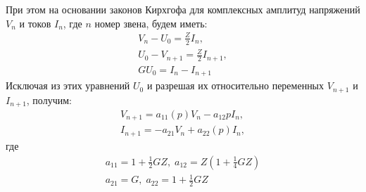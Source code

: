 При этом на основании законов Кирхгофа для комплексных амплитуд напряжений $V_n$ и токов $I_n$, где $n$ номер звена, будем иметь:
\begin{equation}
	\label{eq:1.1}
	\begin{gathered}
	V_n-U_0=\frac{Z}{2}I_n, \\
	U_0-V_{n+1}=\frac{Z}{2}I_{n+1}, \\
	GU_0=I_n-I_{n+1}
	\end{gathered}
\end{equation}
Исключая из этих уравнений $U_0$ и разрешая их относительно переменных $V_{n+1}$ и $I_{n+1}$, получим:
\begin{equation}
	\label{eq:1.2}
	\begin{gathered}
	V_{n+1}=a_{11}(p)V_n-a_{12}{p}I_n, \\
	I_{n+1}=-a_{21}V_n+a_{22}(p)I_n,
	\end{gathered}
\end{equation}
где
\begin{equation}
	\label{eq:1.3}
	\begin{gathered}
		a_{11}=1+\frac{1}{2}GZ,\; 
		a_{12}=Z\left(1+\frac{1}{4}GZ\right)\\
		a_{21}=G,\;
		a_{22}=1+\frac{1}{2}GZ
		\end{gathered}
\end{equation}

